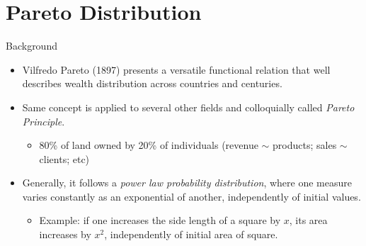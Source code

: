 \documentclass[ignorenonframetext,]{beamer}
\date{}
\providecommand{\tightlist}{%
  \setlength{\itemsep}{0pt}\setlength{\parskip}{0pt}}
\begin{document}
\hypertarget{pareto-distribution}{%
\section{Pareto Distribution}\label{pareto-distribution}}

\begin{frame}{Background}
\protect\hypertarget{background}{}

\begin{itemize}
\tightlist
\item
  Vilfredo Pareto (1897) presents a versatile functional relation that
  well describes wealth distribution across countries and centuries.
\item
  Same concept is applied to several other fields and colloquially
  called \emph{Pareto Principle}.

  \begin{itemize}
  \tightlist
  \item
    80\% of land owned by 20\% of individuals (revenue \(\sim\)
    products; sales \(\sim\) clients; etc)
  \end{itemize}
\item
  Generally, it follows a \emph{power law probability distribution},
  where one measure varies constantly as an exponential of another,
  independently of initial values.

  \begin{itemize}
  \tightlist
  \item
    Example: if one increases the side length of a square by \(x\), its
    area increases by \(x^2\), independently of initial area of square.
  \end{itemize}
\end{itemize}


\end{frame}
\end{document}
